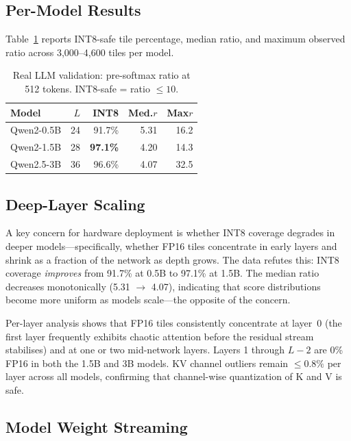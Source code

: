 \documentclass[10pt,twocolumn]{article}
\begin{document}
\subsection{Per-Model Results}

Table~\ref{tab:real_llm} reports INT8-safe tile percentage, median
ratio, and maximum observed ratio across 3{,}000--4{,}600 tiles per
model.

\begin{table}[tbp]
\centering
\caption{Real LLM validation: pre-softmax ratio at 512 tokens.
  INT8-safe = ratio $\leq 10$.}
\label{tab:real_llm}
\small
\setlength{\tabcolsep}{5pt}
\begin{tabular}{lrrrr}
\toprule
Model & $L$ & INT8 & Med.$r$ & Max$r$ \\
\midrule
Qwen2-0.5B & 24 & 91.7\% & 5.31 & 16.2 \\
Qwen2-1.5B & 28 & \textbf{97.1\%} & 4.20 & 14.3 \\
Qwen2.5-3B & 36 & 96.6\% & 4.07 & 32.5 \\
\bottomrule
\end{tabular}
\end{table}

\subsection{Deep-Layer Scaling}

A key concern for hardware deployment is whether INT8 coverage degrades
in deeper models---specifically, whether FP16 tiles concentrate in
early layers and shrink as a fraction of the network as depth grows.
The data refutes this: INT8 coverage \emph{improves} from 91.7\% at
0.5B to 97.1\% at 1.5B. The median ratio decreases monotonically
(5.31 $\to$ 4.07), indicating that score distributions become more
uniform as models scale---the opposite of the concern.

Per-layer analysis shows that FP16 tiles consistently concentrate at
layer~0 (the first layer frequently exhibits chaotic attention before
the residual stream stabilises) and at one or two mid-network layers.
Layers 1 through $L{-}2$ are 0\% FP16 in both the 1.5B and 3B models.
KV channel outliers remain $\leq 0.8\%$ per layer across all models,
confirming that channel-wise quantization of K and V is safe.

\subsection{Model Weight Streaming}
\label{sec:streaming}
\end{document}
